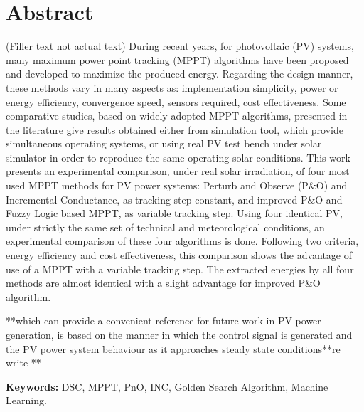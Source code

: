 \chapter*{Abstract}
\thispagestyle{begin}




(Filler text not actual text) During recent years, for photovoltaic (PV) systems, many maximum power point tracking (MPPT) algorithms have been proposed and developed to maximize the produced energy. Regarding the design manner, these methods vary in many aspects as: implementation simplicity, power or energy efficiency, convergence speed, sensors required, cost effectiveness. Some comparative studies, based on widely-adopted MPPT algorithms, presented in the literature give results obtained either from simulation tool, which provide simultaneous operating systems, or using real PV test bench under solar simulator in order to reproduce the same operating solar conditions. This work presents an experimental comparison, under real solar irradiation, of four most used MPPT methods for PV power systems: Perturb and Observe (P\&O) and Incremental Conductance, as tracking step constant, and improved P\&O and Fuzzy Logic based MPPT, as variable tracking step. Using four identical PV, under strictly the same set of technical and meteorological conditions, an experimental comparison of these four algorithms is done. Following two criteria, energy efficiency and cost effectiveness, this comparison shows the advantage of use of a MPPT with a variable tracking step. The extracted energies by all four methods are almost identical with a slight advantage for improved P\&O algorithm. \newline

**which can provide a convenient reference for future work in PV power generation, is based on the manner in which the control signal is generated and the PV power system behaviour as it approaches steady state conditions**re write **

{\bf Keywords:} DSC, MPPT, PnO, INC, Golden Search Algorithm, Machine Learning. 
\acresetall
